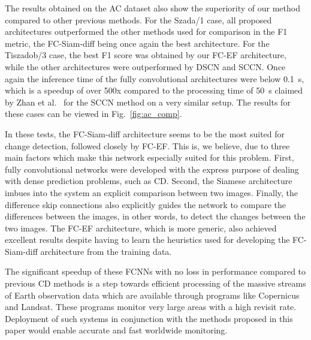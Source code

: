 \documentclass{article}
\begin{document}
The results obtained on the AC dataset also show the superiority of our method compared to other previous methods. For the Szada/1 case, all proposed architectures outperformed the other methods used for comparison in the F1 metric, the FC-Siam-diff being once again the best architecture. For the Tiszadob/3 case, the best F1 score was obtained by our FC-EF architecture, while the other architectures were outperformed by DSCN and SCCN. Once again the inference time of the fully convolutional architectures were below 0.1~s, which is a speedup of over 500x compared to the processing time of 50~s claimed by Zhan et al.~\cite{zhan2017change} for the SCCN method on a very similar setup. The results for these cases can be viewed in Fig.~\ref{fig:ac_comp}.










In these tests, the FC-Siam-diff architecture seems to be the most suited for change detection, followed closely by FC-EF. This is, we believe, due to three main factors which make this network especially suited for this problem. First, fully convolutional networks were developed with the express purpose of dealing with dense prediction problems, such as CD. Second, the Siamese architecture imbues into the system an explicit comparison between two images. Finally, the difference skip connections also explicitly guides the network to compare the differences between the images, in other words, to detect the changes between the two images. The FC-EF architecture, which is more generic, also achieved excellent results despite having to learn the heuristics used for developing the FC-Siam-diff architecture from the training data.

The significant speedup of these FCNNs with no loss in performance compared to previous CD methods is a step towards efficient processing of the massive streams of Earth observation data which are available through programs like Copernicus and Landsat. These programs monitor very large areas with a high revisit rate. Deployment of such systems in conjunction with the methods proposed in this paper would enable accurate and fast worldwide monitoring.
\end{document}

